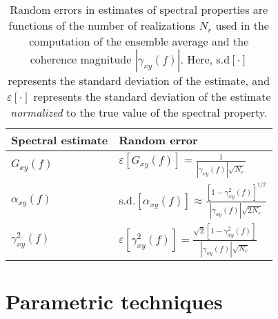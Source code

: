 \begin{table}[t]
  \centering
  \renewcommand{\arraystretch}{1.5}%
  \begin{tabular}{%
    >{\centering}m{5.0cm} >{\centering}m{5.0cm}
  }
    \toprule%
    \textbf{Spectral estimate}
    & \textbf{Random error} \cite{bendat_and_piersol}
    \tabularnewline%
    \midrule
    $G_{xy}(f)$
    & $\varepsilon \left[G_{xy}(f) \right]
    =
    \frac{1}{|\gamma_{xy}(f)| \sqrt{N_r}}$
    \tabularnewline%
    $\alpha_{xy}(f)$
    & s.d.$\left[ \alpha_{xy}(f) \right]
    \approx
    \frac{[1 - \gamma_{xy}^2(f)]^{1/2}}{|\gamma_{xy}(f)| \sqrt{2 N_r}}$
    \tabularnewline%
    $\gamma_{xy}^2(f)$
    & $\varepsilon \left[ \gamma_{xy}^2(f) \right]
    =
    \frac{\sqrt{2} [1 - \gamma_{xy}^2(f)]}{|\gamma_{xy}(f)| \sqrt{N_r}}$
    \tabularnewline%
    \toprule%
  \end{tabular}
  \caption[Random errors in spectral estimates]{%
    Random errors in estimates of spectral properties are functions of
    the number of realizations $N_r$ used
    in the computation of the ensemble average and
    the coherence magnitude $|\gamma_{xy}(f)|$.
    Here, s.d$[\cdot]$ represents the standard deviation of the estimate, and
    $\varepsilon[\cdot]$ represents the standard deviation of the estimate
    \emph{normalized} to the true value of the spectral property.
    }%
\label{table:ToroidalCorrelation:spectral_estimate_random_errors}
\end{table}


\section{Parametric techniques}
\label{app:SpectralEstimation:Parametric}




